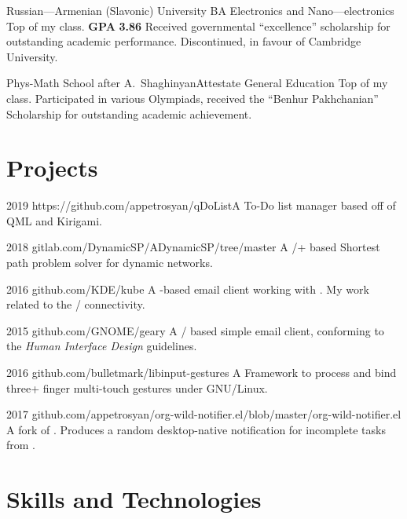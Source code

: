\documentclass{CurriculumVitae}[10pt, draft, condensed]
\begin{document}
 {Russian---Armenian (Slavonic) University}
{BA }{Electronics and Nano---electronics} {Top of my class. \textbf{GPA}
  \textbf{3.86} Received governmental ``excellence'' scholarship for
  outstanding academic performance. Discontinued, in favour of
  Cambridge University.}

 {Phys-Math School after
  A.~Shaghinyan}{Attestate }{General Education} {Top of my
  class. Participated in various Olympiads, received the ``Benhur
  Pakhchanian'' Scholarship for outstanding academic achievement. }

\section*{Projects}

 {2019}
{https://github.com/appetrosyan/qDoList}{A To-Do
  list manager based off of QML and Kirigami.}

 {2018}
{gitlab.com/DynamicSP/ADynamicSP/tree/master} {A
  /+ based Shortest path problem solver
  for dynamic networks. }

 {2016} {github.com/KDE/kube} {A -based
  email client working with . My work related to
  the / connectivity. }

 {2015} {github.com/GNOME/geary} {A
  / based simple email client, conforming to
  the  \emph{Human Interface Design} guidelines.}

 {2016}
{github.com/bulletmark/libinput-gestures} {A Framework to process and
  bind three+ finger multi-touch gestures under GNU/Linux. }

 {2017}
{github.com/appetrosyan/org-wild-notifier.el/blob/master/org-wild-notifier.el}
{A fork of . Produces a random desktop-native
  notification for incomplete tasks from . }



\section*{Skills and Technologies}
\end{document}
